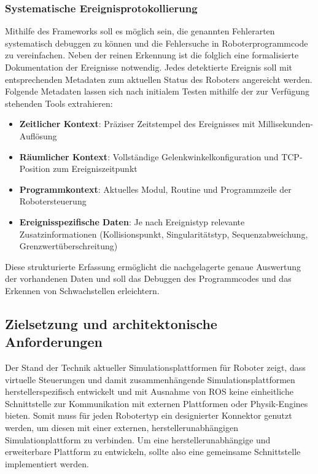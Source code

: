 \subsubsection{Systematische Ereignisprotokollierung}

Mithilfe des Frameworks soll es möglich sein, die genannten Fehlerarten
systematisch debuggen zu können und die Fehlersuche in Roboterprogrammcode zu
vereinfachen. Neben der reinen Erkennung ist die folglich eine formalisierte
Dokumentation der Ereignisse notwendig. Jedes detektierte Ereignis soll mit
entsprechenden Metadaten zum aktuellen Status des Roboters angereicht werden.
Folgende Metadaten lassen sich nach initialem Testen mithilfe der zur Verfügung
stehenden Tools extrahieren:

\begin{itemize}
	\item \textbf{Zeitlicher Kontext}: Präziser Zeitstempel des Ereignisses mit Millisekunden-Auflösung
	\item \textbf{Räumlicher Kontext}: Vollständige Gelenkwinkelkonfiguration und TCP-Position zum Ereigniszeitpunkt
	\item \textbf{Programmkontext}: Aktuelles Modul, Routine und Programmzeile der Robotersteuerung
	\item \textbf{Ereignisspezifische Daten}: Je nach Ereignistyp relevante Zusatzinformationen (Kollisionspunkt, Singularitätstyp, Sequenzabweichung, Grenzwertüberschreitung)
\end{itemize}
\noindent
Diese strukturierte Erfassung ermöglicht die nachgelagerte genaue Auswertung der
vorhandenen Daten und soll das Debuggen des Programmcodes und das Erkennen von
Schwachstellen erleichtern.

\subsection{Zielsetzung und architektonische Anforderungen}
Der Stand der Technik aktueller Simulationsplattformen für Roboter zeigt, dass
virtuelle Steuerungen und damit zusammenhängende Simulationsplattformen
herstellerspezifisch entwickelt und mit Ausnahme von ROS keine einheitliche
Schnittstelle zur Kommunikation mit externen Plattformen oder Physik-Engines
bieten. Somit muss für jeden Robotertyp ein designierter Konnektor genutzt
werden, um diesen mit einer externen, herstellerunabhängigen Simulationplattform
zu verbinden. Um eine herstellerunabhängige und erweiterbare Plattform zu
entwickeln, sollte also eine gemeinsame Schnittstelle implementiert werden.\\

